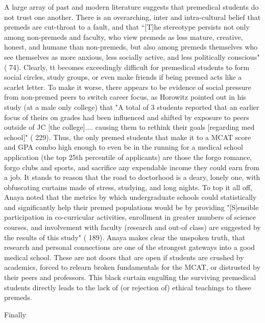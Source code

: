 \documentclass [12pt]{article}
\begin{document}
\begin{flushleft}
A large array of past and modern literature suggests that premedical students do not trust one another. There is an overarching, inter and intra-cultural belief that premeds are cut-throat to a fault, and that {``}[T]he stereotype persists not only among non-premeds and faculty, who view premeds as less mature, creative, honest, and humane than non-premeds, but also among premeds themselves who see themselves as more anxious, less socially active, and less politically conscious" (\cite{Olsen-2016} 74). Clearly, tt becomes exceedingly difficult for premedical students to form social circles, study groups, or even make friends if being premed acts like a scarlet letter. To make it worse, there appears to be evidence of social pressure from non-premed peers to switch career focus, as Horowitz pointed out in his study (at a male only college) that "A total of 3 students reported that an earlier focus of theirs on grades had been influenced and shifted by exposure to peers outside of JC [the college].... causing them to rethink their goals [regarding med school]" (\cite{Horowitz-2010} 229). Thus, the only premed students that make it to a MCAT score and GPA combo high enough to even be in the running for a medical school application (the top 25th percentile of applicants) are those the forgo romance, forgo clubs and sports, and sacrifice any expendable income they could earn from a job. It stands to reason that the road to doctorhood is a deary, lonely one, with obfuscating curtains made of stress, studying, and long nights. To top it all off, Anaya noted that the metrics by which undergraduate schools could statistically and significantly help their premed populations would be by providing "[S]ensible participation in co-curricular activities, enrollment in greater numbers of science courses, and involvement with faculty (research and out-of class) are suggested by the results of this study" (\cite{Anaya-2001} 189).
Anaya makes clear the unspoken truth, that research and personal connections are one of the strongest gateways into a good medical school. These are not doors that are open if students are crushed by academics, forced to relearn broken fundamentals for the MCAT, or distrusted by their peers and professors. This black curtain engulfing the surviving premedical students directly leads to the lack of (or rejection of) ethical teachings to these premeds.

	Finally
	
	
\newpage
\medskip %
\nocite{*} %
\printbibliography%
\end{flushleft}
\end{document}
